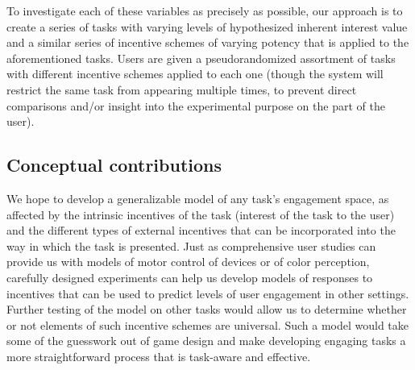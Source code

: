 To investigate each of these variables as precisely as possible, our approach is to create a series of tasks with varying levels of hypothesized inherent interest value and a similar series of incentive schemes of varying potency that is applied to the aforementioned tasks. Users are given a pseudorandomized assortment of tasks with different incentive schemes applied to each one (though the system will restrict the same task from appearing multiple times, to prevent direct comparisons and/or insight into the experimental purpose on the part of the user).

\subsection{Conceptual contributions}

We hope to develop a generalizable model of any task's engagement space, as affected by the intrinsic incentives of the task (interest of the task to the user) and the different types of external incentives that can be incorporated into the way in which the task is presented. Just as comprehensive user studies can provide us with models of motor control of devices or of color perception, carefully designed experiments can help us develop models of responses to incentives that can be used to predict levels of user engagement in other settings. Further testing of the model on other tasks would allow us to determine whether or not elements of such incentive schemes are universal. Such a model would take some of the guesswork out of game design and make developing engaging tasks a more straightforward process that is task-aware and effective.
